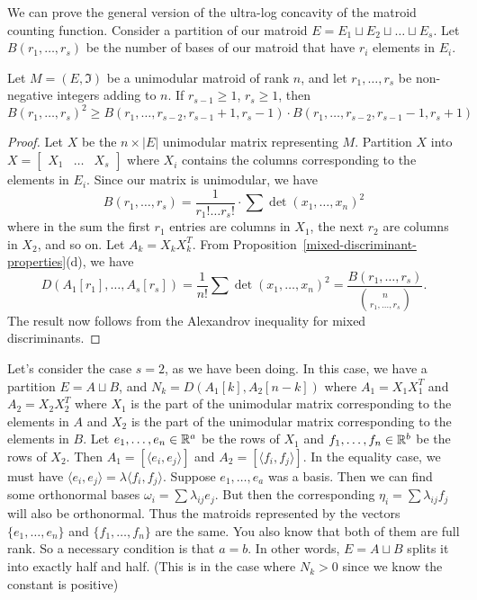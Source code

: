 \documentclass[12pt]{article}
\begin{document}
We can prove the general version of the ultra-log concavity of the matroid counting function. Consider a partition of our matroid $E = E_1 \sqcup E_2 \sqcup \ldots \sqcup E_s$. Let $B(r_1, \ldots, r_s)$ be the number of bases of our matroid that have $r_i$ elements in $E_i$. 

\begin{thm}
	Let $M = (E, \mathfrak{I})$ be a unimodular matroid of rank $n$, and let $r_1, \ldots, r_s$ be non-negative integers adding to $n$. If $r_{s-1} \geq 1$, $r_s \geq 1$, then 
	\[
		B(r_1, \ldots, r_s)^2 \geq B(r_1, \ldots, r_{s-2}, r_{s-1} + 1, r_s - 1) \cdot B(r_1, \ldots, r_{s-2}, r_{s-1} - 1, r_{s} + 1)
	\]
\end{thm}

\begin{proof}
	Let $X$ be the $n \times |E|$ unimodular matrix representing $M$. Partition $X$ into $X = \begin{bmatrix} X_1 & \ldots & X_s \end{bmatrix}$ where $X_i$ contains the columns corresponding to the elements in $E_i$. Since our matrix is unimodular, we have 
	\[
		B(r_1, \ldots, r_s) = \frac{1}{r_1! \ldots r_s!} \cdot \sum \det (x_1, \ldots, x_n)^2
	\]
	where in the sum the first $r_1$ entries are columns in $X_1$, the next $r_2$ are columns in $X_2$, and so on. Let $A_k = X_k X_k^T$. From Proposition~\ref{mixed-discriminant-properties}(d), we have 
	\[
		D(A_1 [r_1], \ldots, A_s [r_s]) = \frac{1}{n!} \sum \det (x_1, \ldots, x_n)^2 = \frac{B(r_1, \ldots, r_s)}{\binom{n}{r_1, \ldots, r_s}}. 
	\] 
	The result now follows from the Alexandrov inequality for mixed discriminants. 
\end{proof}

Let's consider the case $s = 2$, as we have been doing. In this case, we have a partition $E = A \sqcup B$, and $N_k = D(A_1[k], A_2[n-k])$ where $A_1 = X_1 X_1^T$ and $A_2 = X_2 X_2^T$ where $X_1$ is the part of the unimodular matrix corresponding to the elements in $A$ and $X_2$ is the part of the unimodular matrix corresponding to the elements in $B$. Let $e_1, \ldots, e_n \in \mathbb{R}^a$ be the rows of $X_1$ and $f_1, \ldots, f_n \in \mathbb{R}^b$ be the rows of $X_2$. Then $A_1 = [\langle e_i, e_j \rangle ]$ and $A_2 = [\langle f_i, f_j \rangle]$. In the equality case, we must have $\langle e_i, e_j \rangle = \lambda \langle f_i, f_j \rangle$. Suppose $e_1, \ldots, e_a$ was a basis. Then we can find some orthonormal bases $\omega_i = \sum \lambda_{ij} e_j$. But then the corresponding $\eta_i = \sum \lambda_{ij} f_j$ will also be orthonormal. Thus the matroids represented by the vectors $\{e_1, \ldots, e_n\}$ and $\{f_1, \ldots, f_n\}$ are the same. You also know that both of them are full rank. So a necessary condition is that $a = b$. In other words, $E = A \sqcup B$ splits it into exactly half and half. (This is in the case where $N_k > 0$ since we know the constant is positive)
\end{document}
